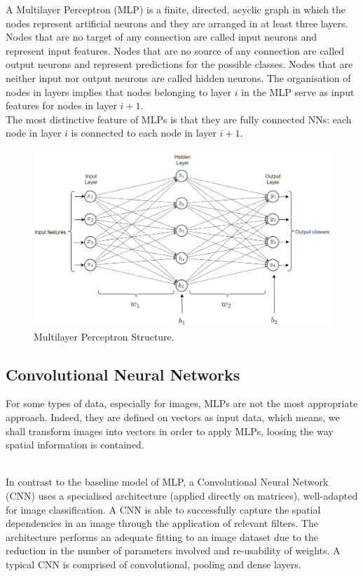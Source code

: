 A Multilayer Perceptron (MLP) is a finite, directed, acyclic graph in which the nodes represent artificial neurons and they are arranged in at least three layers. Nodes that are no target of any connection are called input neurons and represent input features. Nodes that are no source of any connection are called output neurons and represent predictions for the possible classes. Nodes that are neither input nor output neurons are called hidden neurons. The organisation of nodes in layers implies that nodes belonging to layer $i$ in the MLP serve as input features for nodes in layer $i+1$. \\

The most distinctive feature of MLPs is that they are fully connected NNs: each node in layer $i$ is connected to each node in layer $i+1$.

\begin{figure}[H]
  \centering
  \includegraphics[scale = 0.5]{Images/mlp.png}
  \caption{Multilayer Perceptron Structure.}
  \label{Multilayer Perceptron}
\end{figure}

\subsection{Convolutional Neural Networks}

For some types of data, especially for images, MLPs are not the most appropriate approach. Indeed, they are defined on vectors as input data, which means, we shall transform images into vectors in order to apply MLPs, loosing the way spatial information is contained. \\\

In contrast to the baseline model of MLP, a Convolutional Neural Network (CNN) uses a specialised architecture (applied directly on matrices), well-adapted for image classification. A CNN is able to successfully capture the spatial dependencies in an image through the application of relevant filters. The architecture performs an adequate fitting to an image dataset due to the reduction in the number of parameters involved and re-usability of weights. A typical CNN is comprised of convolutional, pooling and dense layers. \\

